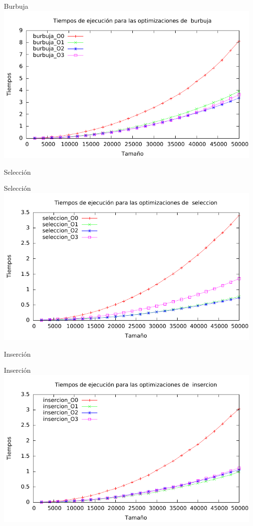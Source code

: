 \documentclass[10pt,compress,usetitleprogressbar,mathserif]{beamer}
\begin{document}
\begin{frame}{Burbuja}
	\includegraphics[width = \textwidth ]{img/burbuja_optim_g.pdf}
\end{frame}

\begin{frame}{Selección}
	
\end{frame}

\begin{frame}{Selección}
	\includegraphics[width = \textwidth ]{img/seleccion_optim_g.pdf}
\end{frame}

\begin{frame}{Inserción}
	
\end{frame}

\begin{frame}{Inserción}
	\includegraphics[width = \textwidth ]{img/insercion_optim_g.pdf}
\end{frame}
\end{document}
